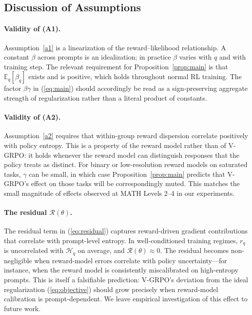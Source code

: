 \documentclass[10pt]{article}
\begin{document}
\subsection{Discussion of Assumptions}
\label{sec:theory:discussion}

\paragraph{Validity of (A1).}
Assumption~\ref{a1} is a linearization of the reward--likelihood relationship.
A constant $\beta$ across prompts is an idealization; in practice $\beta$
varies with $q$ and with training step. The relevant requirement for
Proposition~\ref{prop:main} is that $\mathbb{E}_q[\beta_q]$ exists and is positive,
which holds throughout normal RL training. The factor $\beta\gamma$ in
(\ref{eq:main}) should accordingly be read as a sign-preserving aggregate
strength of regularization rather than a literal product of constants.

\paragraph{Validity of (A2).}
Assumption~\ref{a2} requires that within-group reward dispersion correlate
positively with policy entropy. This is a property of the reward model rather
than of V-GRPO: it holds whenever the reward model can distinguish responses
that the policy treats as distinct. For binary or low-resolution reward
models on saturated tasks, $\gamma$ can be small, in which case
Proposition~\ref{prop:main} predicts that V-GRPO's effect on those tasks
will be correspondingly muted. This matches the small magnitude of effects
observed at MATH Levels 2--4 in our experiments.

\paragraph{The residual $\mathcal{R}(\theta)$.}
The residual term in (\ref{eq:residual}) captures reward-driven gradient
contributions that correlate with prompt-level entropy. In well-conditioned
training regimes, $r_q$ is uncorrelated with $\mathcal{H}_q$ on average, and
$\mathcal{R}(\theta) \approx 0$. The residual becomes non-negligible when
reward-model errors correlate with policy uncertainty---for instance, when
the reward model is consistently miscalibrated on high-entropy prompts.
This is itself a falsifiable prediction: V-GRPO's deviation from
the ideal regularization (\ref{eq:objective}) should grow precisely when
reward-model calibration is prompt-dependent. We leave empirical
investigation of this effect to future work.
\end{document}
